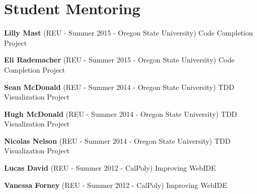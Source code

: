 \documentclass[10pt]{article}
\begin{document}
\vspace{10pt}

%
%
%
%

\section{Student Mentoring}
\begin{bibsection}
\setlength\itemsep{2pt}

\item \textbf{Lilly Mast } (REU - Summer 2015 - Oregon State University) Code Completion Project
\item \textbf{Eli Rademacher } (REU - Summer 2015 - Oregon State University) Code Completion Project
\item \textbf{Sean McDonald } (REU - Summer 2014 - Oregon State University) TDD Visualization Project
\item \textbf{Hugh McDonald } (REU - Summer 2014 - Oregon State University) TDD Visualization Project
\item \textbf{Nicolas Nelson} (REU - Summer 2014 - Oregon State University) TDD Visualization Project
\item \textbf{Lucas David} (REU - Summer 2012 - CalPoly) Improving WebIDE
\item \textbf{Vanessa Forney} (REU - Summer 2012 - CalPoly) Improving WebIDE
\end{bibsection}
\end{document}
